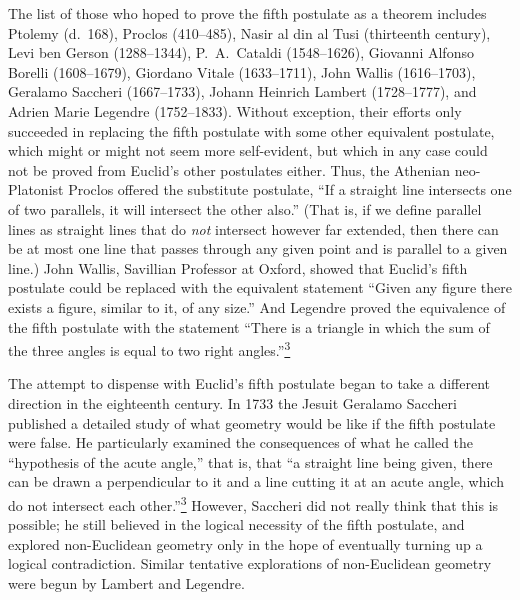 The list of those who hoped to prove the fifth postulate as a theorem includes
Ptolemy (d.\ 168), Proclos (410--485), Nasir al din al Tusi (thirteenth
century), Levi ben Gerson (1288--1344), P.\ A.\ Cataldi (1548--1626), Giovanni
Alfonso Borelli (1608--1679), Giordano Vitale (1633--1711), John Wallis
(1616--1703), Geralamo Saccheri (1667--1733), Johann Heinrich Lambert
(1728--1777), and Adrien Marie Legendre (1752--1833). Without exception,
their efforts only succeeded in replacing the fifth postulate with some other
equivalent postulate, which might or might not seem more self-evident, but
which in any case could not be proved from Euclid's other postulates either.
Thus, the Athenian neo-Platonist Proclos offered the substitute postulate, ``If
a straight line intersects one of two parallels, it will intersect the other
also.'' (That is, if we define parallel lines as straight lines that do
\emph{not} intersect however far extended, then there can be at most one line
that passes through any given point and is parallel to a given line.) John
Wallis, Savillian Professor at Oxford, showed that Euclid's fifth postulate
could be replaced with the equivalent statement ``Given any figure there
exists a figure, similar to it, of any size.'' And Legendre proved the
equivalence of the fifth postulate with the statement ``There is a triangle in
which the sum of the three angles is equal to two right
angles.''\hyperref[ch1-ref-3]{\textsuperscript{3}}

The attempt to dispense with Euclid's fifth postulate began to take a different
direction in the eighteenth century. In 1733 the Jesuit Geralamo Saccheri
published a detailed study of what geometry would be like if the fifth
postulate were false. He particularly examined the consequences of what he
called the ``hypothesis of the acute angle,'' that is, that ``a straight line
being given, there can be drawn a perpendicular to it and a line cutting it at
an acute angle, which do not intersect each
other.''\hyperref[ch1-ref-3]{\textsuperscript{3}} However, Saccheri did not
really think that this is possible; he still believed in the logical necessity
of the fifth postulate, and explored non-Euclidean geometry only in the hope
of eventually turning up a logical contradiction. Similar tentative
explorations of non-Euclidean geometry were begun by Lambert and Legendre.

